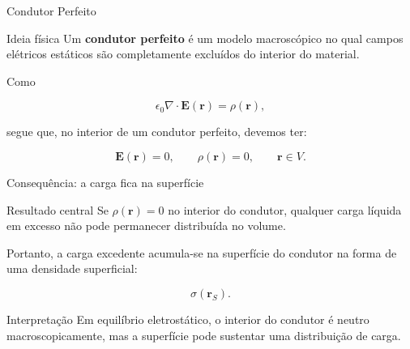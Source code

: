 \documentclass[aspectratio=169]{beamer}
\begin{document}
\begin{frame}{Condutor Perfeito}

\begin{mybox}{Ideia física}
Um \textbf{condutor perfeito} é um modelo macroscópico no qual campos elétricos
estáticos são completamente excluídos do interior do material.
\end{mybox}

\vspace{0.3cm}

Como

\begin{eqbox}
\begin{equation}
\epsilon_0 \nabla \cdot \mathbf E(\mathbf r)=\rho(\mathbf r),
\label{eq:gauss-local}
\end{equation}
\end{eqbox}

segue que, no interior de um condutor perfeito, devemos ter:

\begin{eqbox}
\begin{equation}
\mathbf E(\mathbf r)=0,
\qquad
\rho(\mathbf r)=0,
\qquad
\mathbf r \in V.
\tag{5.1}
\label{eq:condutor-perfeito}
\end{equation}
\end{eqbox}

\end{frame}

\begin{frame}{Consequência: a carga fica na superfície}

\begin{mybox}{Resultado central}
Se \(\rho(\mathbf r)=0\) no interior do condutor, qualquer carga líquida em excesso
não pode permanecer distribuída no volume.
\end{mybox}

\vspace{0.3cm}

Portanto, a carga excedente acumula-se na superfície do condutor na forma de uma
densidade superficial:

\[
\sigma(\mathbf r_S).
\]

\begin{alertblock}{Interpretação}
Em equilíbrio eletrostático, o interior do condutor é neutro macroscopicamente,
mas a superfície pode sustentar uma distribuição de carga.
\end{alertblock}

\end{frame}
\end{document}
